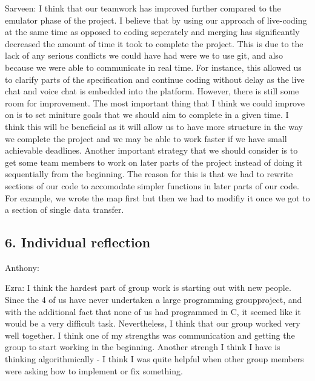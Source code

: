 \documentclass[a4paper]{article}
\begin{document}
Sarveen: I think that our teamwork has improved further compared to the emulator phase of the project. I believe that
by using our approach of live-coding at the same time as opposed to coding seperately and merging has significantly
decreased the amount of time it took to complete the project. This is due to the lack of any serious conflicts we could
have had were we to use git, and also because we were able to communicate in real time. For instance, this allowed us 
to clarify parts of the specification and continue coding without delay as the live chat and voice chat is embedded
into the platform. However, there is still some room for improvement. The most important thing that I think we could 
improve on is to set miniture goals that we should aim to complete in a given time. I think this will be beneficial 
as it will allow us to have more structure in the way we complete the project and we may be able to work faster if we
have small achievable deadlines. Another important strategy that we should consider is to get some team members to work
on later parts of the project instead of doing it sequentially from the beginning. The reason for this is that we had 
to rewrite sections of our code to accomodate simpler functions in later parts of our code.  For example, we wrote the 
map first but then we had to modifiy it once we got to a section of single data transfer. 

\bigskip
\subsection*{6. Individual reflection}

Anthony:

Ezra: I think the hardest part of group work is starting out with new people. Since the 4 of us have never undertaken a 
large programming groupproject, and with the additional fact that none of us had programmed in C, it seemed like it would
be a very difficult task. Nevertheless, I think that our group worked very well together. I think one of my strengths was 
communication and getting the group to start working in the beginning. Another strengh I think I have is thinking algorithmically - 
I think I was quite helpful when other group members were asking how to implement or fix something. 
\end{document}
